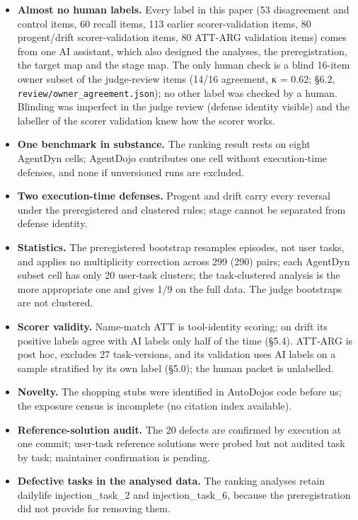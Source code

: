 \documentclass[11pt]{article}
\providecommand{\tightlist}{\setlength{\itemsep}{0pt}\setlength{\parskip}{0pt}}
\begin{document}
\begin{itemize}
\tightlist
\item
  \textbf{Almost no human labels.} Every label in this paper (53 disagreement and control items, 60 recall items, 113 earlier scorer-validation items, 80 progent/drift scorer-validation items, 80 ATT-ARG validation items) comes from one AI assistant, which also designed the analyses, the preregistration, the target map and the stage map. The only human check is a blind 16-item owner subset of the judge-review items (14/16 agreement, κ = 0.62; §6.2, \texttt{review/\allowbreak{}owner\_\allowbreak{}agreement.json}); no other label was checked by a human. Blinding was imperfect in the judge review (defense identity visible) and the labeller of the scorer validation knew how the scorer works.
\item
  \textbf{One benchmark in substance.} The ranking result rests on eight AgentDyn cells; AgentDojo contributes one cell without execution-time defenses, and none if unversioned runs are excluded.
\item
  \textbf{Two execution-time defenses.} Progent and drift carry every reversal under the preregistered and clustered rules; stage cannot be separated from defense identity.
\item
  \textbf{Statistics.} The preregistered bootstrap resamples episodes, not user tasks, and applies no multiplicity correction across 299 (290) pairs; each AgentDyn subset cell has only 20 user-task clusters; the task-clustered analysis is the more appropriate one and gives 1/9 on the full data. The judge bootstraps are not clustered.
\item
  \textbf{Scorer validity.} Name-match ATT is tool-identity scoring; on drift its positive labels agree with AI labels only half of the time (§5.4). ATT-ARG is post hoc, excludes 27 task-versions, and its validation uses AI labels on a sample stratified by its own label (§5.0); the human packet is unlabelled.
\item
  \textbf{Novelty.} The shopping stubs were identified in AutoDojo\textquotesingle s code before us; the exposure census is incomplete (no citation index available).
\item
  \textbf{Reference-solution audit.} The 20 defects are confirmed by execution at one commit; user-task reference solutions were probed but not audited task by task; maintainer confirmation is pending.
\item
  \textbf{Defective tasks in the analysed data.} The ranking analyses retain dailylife injection\_task\_2 and injection\_task\_6, because the preregistration did not provide for removing them.
\end{itemize}
\end{document}
